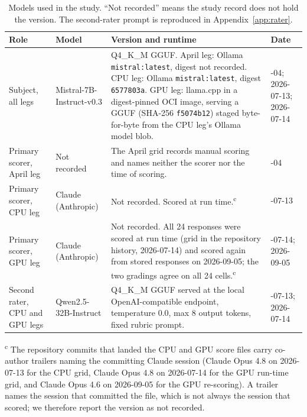 \documentclass[11pt,a4paper]{article}
\begin{document}
\begin{table}[h]
\centering
\small
\caption{Models used in the study. ``Not recorded'' means the study record
  does not hold the version. The second-rater prompt is reproduced in
  Appendix~\ref{app:rater}.}
\label{tab:agents}
\begin{tabular}{@{}>{\raggedright\arraybackslash}p{3.1cm}>{\raggedright\arraybackslash}p{3.4cm}>{\raggedright\arraybackslash}p{4.8cm}>{\raggedright\arraybackslash}p{2.6cm}@{}}
\toprule
Role & Model & Version and runtime & Date \\
\midrule
Subject, all legs & Mistral-7B-Instruct-v0.3 & Q4\_K\_M GGUF. April leg: Ollama \texttt{mistral:latest}, digest not recorded. CPU leg: Ollama \texttt{mistral:latest}, digest \texttt{6577803a}. GPU leg: llama.cpp in a digest-pinned OCI image, serving a GGUF (SHA-256 \texttt{f5074b12}) staged byte-for-byte from the CPU leg's Ollama model blob. & 2026-04; 2026-07-13; 2026-07-14 \\
Primary scorer, April leg & Not recorded & The April grid records manual scoring and names neither the scorer nor the time of scoring. & 2026-04 \\
Primary scorer, CPU leg & Claude (Anthropic) & Not recorded. Scored at run time.\textsuperscript{c} & 2026-07-13 \\
Primary scorer, GPU leg & Claude (Anthropic) & Not recorded. All 24 responses were scored at run time (grid in the repository history, 2026-07-14) and scored again from stored responses on 2026-09-05; the two gradings agree on all 24 cells.\textsuperscript{c} & 2026-07-14; 2026-09-05 \\
Second rater, CPU and GPU legs & Qwen2.5-32B-Instruct & Q4\_K\_M GGUF served at the local OpenAI-compatible endpoint, temperature 0.0, max 8 output tokens, fixed rubric prompt. & 2026-07-13; 2026-07-14 \\
\bottomrule
\end{tabular}

\smallskip
\footnotesize
\textsuperscript{c} The repository commits that landed the CPU and GPU score
files carry co-author trailers naming the committing Claude session (Claude
Opus 4.8 on 2026-07-13 for the CPU grid, Claude Opus 4.8 on 2026-07-14 for
the GPU run-time grid, and Claude Opus 4.6 on 2026-09-05 for the GPU
re-scoring). A trailer names the
session that committed the file, which is not always the session that scored;
we therefore report the version as not recorded.
\end{table}
\end{document}
